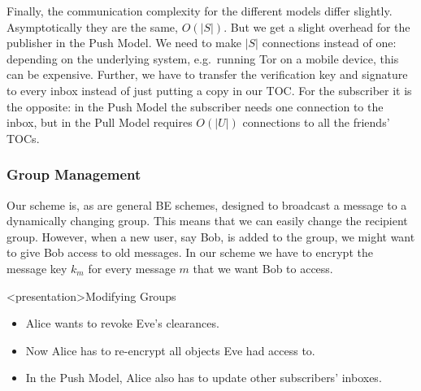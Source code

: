 Finally, the communication complexity for the different models differ slightly.
Asymptotically they are the same, \(O(|S|)\).
But we get a slight overhead for the publisher in the Push Model.
We need to make \(|S|\) connections instead of one: depending on the underlying 
system, e.g.\ running Tor on a mobile device, this can be expensive.
Further, we have to transfer the verification key and signature to every inbox 
instead of just putting a copy in our \ac{TOC}.
For the subscriber it is the opposite: in the Push Model the subscriber needs 
one connection to the inbox, but in the Pull Model requires \(O(|U|)\) 
connections to all the friends' \acp{TOC}.

\subsubsection{Group Management}\label{GroupManagement}


Our scheme is, as are general \ac{BE} schemes, designed to broadcast a message 
to a dynamically changing group.
This means that we can easily change the recipient group.
However, when a new user, say Bob, is added to the group, we might want to give 
Bob access to old messages.
In our scheme we have to encrypt the message key \(k_m\) for every message 
\(m\) that we want Bob to access.

\begin{frame}<presentation>{Modifying Groups}
  \begin{itemize}
    \item Alice wants to revoke Eve's clearances.

      \pause{}

    \item Now Alice has to re-encrypt all objects Eve had access to.

    \item In the Push Model, Alice also has to update other subscribers' 
      inboxes.

  \end{itemize}
\end{frame}

